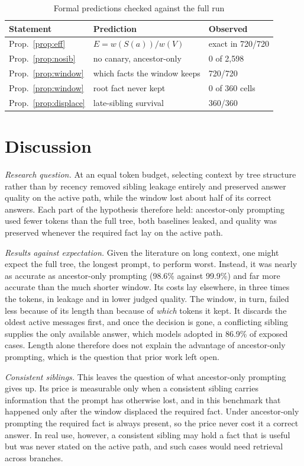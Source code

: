 \documentclass[conference]{IEEEtran}
\theoremstyle{definition}
\newcommand{\Sib}{S(a)}
\begin{document}
\begin{table}[t]
\centering
\caption{Formal predictions checked against the full run}
\label{tab:theory}
\begin{tabular}{@{}lll@{}}
\toprule
Statement & Prediction & Observed \\
\midrule
Prop.~\ref{prop:eff} & $E=w(\Sib)/w(V)$ & exact in 720/720 \\
Prop.~\ref{prop:nosib} & no canary, ancestor-only & 0 of 2{,}598 \\
Prop.~\ref{prop:window} & which facts the window keeps & 720/720 \\
Prop.~\ref{prop:window} & root fact never kept & 0 of 360 cells \\
Prop.~\ref{prop:displace} & late-sibling survival & 360/360 \\
\bottomrule
\end{tabular}
\end{table}

\section{Discussion}

\textit{Research question.} At an equal token budget, selecting context by tree structure rather than by recency removed sibling leakage entirely and preserved answer quality on the active path, while the window lost about half of its correct answers. Each part of the hypothesis therefore held: ancestor-only prompting used fewer tokens than the full tree, both baselines leaked, and quality was preserved whenever the required fact lay on the active path.

\textit{Results against expectation.} Given the literature on long context, one might expect the full tree, the longest prompt, to perform worst. Instead, it was nearly as accurate as ancestor-only prompting (98.6\% against 99.9\%) and far more accurate than the much shorter window. Its costs lay elsewhere, in three times the tokens, in leakage and in lower judged quality. The window, in turn, failed less because of its length than because of \emph{which} tokens it kept. It discards the oldest active messages first, and once the decision is gone, a conflicting sibling supplies the only available answer, which models adopted in 86.9\% of exposed cases. Length alone therefore does not explain the advantage of ancestor-only prompting, which is the question that prior work \cite{nanjundappa2025branching} left open.

\textit{Consistent siblings.} This leaves the question of what ancestor-only prompting gives up. Its price is measurable only when a consistent sibling carries information that the prompt has otherwise lost, and in this benchmark that happened only after the window displaced the required fact. Under ancestor-only prompting the required fact is always present, so the price never cost it a correct answer. In real use, however, a consistent sibling may hold a fact that is useful but was never stated on the active path, and such cases would need retrieval across branches.
\end{document}
